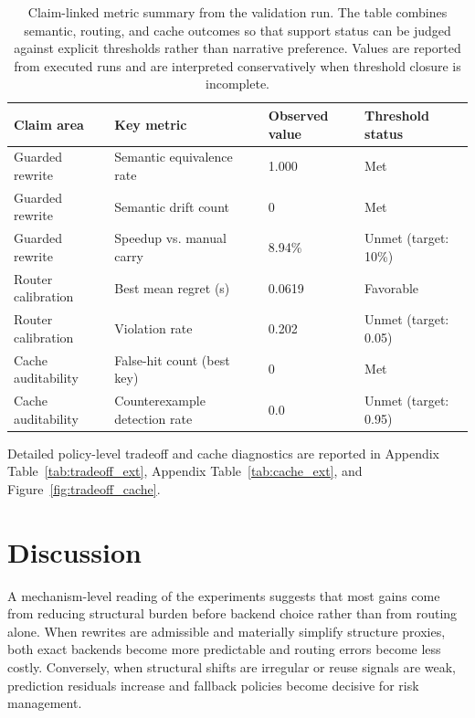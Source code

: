 \documentclass{article} %
\begin{document}
\begin{table}[t]
\caption{Claim-linked metric summary from the validation run. The table combines semantic, routing, and cache outcomes so that support status can be judged against explicit thresholds rather than narrative preference. Values are reported from executed runs and are interpreted conservatively when threshold closure is incomplete.}
\label{tab:core_metrics}
\begin{center}
\small
\renewcommand{\arraystretch}{1.1}
\setlength{\tabcolsep}{4pt}
\begin{tabular}{llll}
\hline
Claim area & Key metric & Observed value & Threshold status \\
\hline
Guarded rewrite & Semantic equivalence rate & 1.000 & Met \\
Guarded rewrite & Semantic drift count & 0 & Met \\
Guarded rewrite & Speedup vs. manual carry & 8.94\% & Unmet (target: 10\%) \\
Router calibration & Best mean regret (s) & 0.0619 & Favorable \\
Router calibration & Violation rate & 0.202 & Unmet (target: 0.05) \\
Cache auditability & False-hit count (best key) & 0 & Met \\
Cache auditability & Counterexample detection rate & 0.0 & Unmet (target: 0.95) \\
\hline
\end{tabular}
\end{center}
\end{table}

Detailed policy-level tradeoff and cache diagnostics are reported in Appendix Table~\ref{tab:tradeoff_ext}, Appendix Table~\ref{tab:cache_ext}, and Figure~\ref{fig:tradeoff_cache}.

\section{Discussion}
\label{sec:discussion}
A mechanism-level reading of the experiments suggests that most gains come from reducing structural burden before backend choice rather than from routing alone. When rewrites are admissible and materially simplify structure proxies, both exact backends become more predictable and routing errors become less costly. Conversely, when structural shifts are irregular or reuse signals are weak, prediction residuals increase and fallback policies become decisive for risk management.
\end{document}
